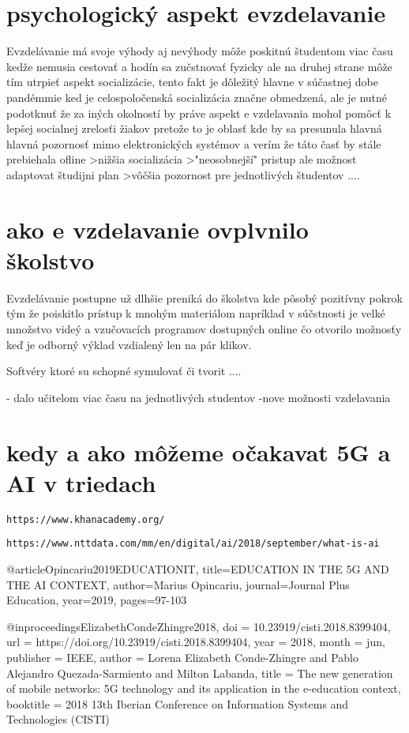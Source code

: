 \documentclass[10pt,oneside,slovak,a4paper]{article}
\begin{document}
\section{psychologický aspekt evzdelavanie }
Evzdelávanie má svoje výhody aj nevýhody môže poskitnú študentom viac času kedže nemusia cestovať a hodín sa zučstnovať fyzicky ale na druhej strane môže tím utrpieť aspekt socializácie, tento fakt je dôležitý hlavne v súčastnej dobe pandémmie ked je celospoločenská socializácia značne obmedzená, ale je nutné podotknuť že za iných okolností by práve aspekt e vzdelavania mohol pomôcť k lepšej socialnej zrelosťi žiakov pretože to je oblasť kde by sa presunula hlavná hlavná pozornosť mimo elektronických systémov a verím že táto časť by stále prebiehala ofline 
>nižšia socializácia 
>"neosobnejší" pristup ale možnost adaptovat študijni plan 
>vôčšia pozornost pre jednotlivých študentov ....

\section{ako e vzdelavanie ovplvnilo školstvo}
Evzdelávanie postupne už dlhšie preniká do školstva kde pôsobý pozitívny pokrok tým že poiskitlo prístup k mnohým materiálom napríklad v súčstnosti je velké množstvo videý a vzučovacích programov dostupných online čo otvorilo možnosťy keď je odborný výklad vzdialený len na pár klikov. 

Softvéry ktoré su schopné symulovať či tvorit ....


- dalo učitelom viac času na jednotlivých studentov 
-nove možnosti vzdelavania 

\section{kedy a ako môžeme očakavat 5G a AI v triedach}


\begin{thebibliography}{9}
	
	\texttt{https://www.khanacademy.org/}
	
	\texttt{https://www.nttdata.com/mm/en/digital/ai/2018/september/what-is-ai}
	\date{22.11.2020}
	
	@article{Opincariu2019EDUCATIONIT,
		title={EDUCATION IN THE 5G AND THE AI CONTEXT},
		author={Marius Opincariu},
		journal={Journal Plus Education},
		year={2019},
		pages={97-103}
	}
	
	@inproceedings{ElizabethCondeZhingre2018,
		doi = {10.23919/cisti.2018.8399404},
		url = {https://doi.org/10.23919/cisti.2018.8399404},
		year = {2018},
		month = jun,
		publisher = {{IEEE}},
		author = {Lorena Elizabeth Conde-Zhingre and Pablo Alejandro Quezada-Sarmiento and Milton Labanda},
		title = {The new generation of mobile networks: 5G technology and its application in the e-education context},
		booktitle = {2018 13th Iberian Conference on Information Systems and Technologies ({CISTI})}
	}
	
	
\end{thebibliography}
\end{document}
